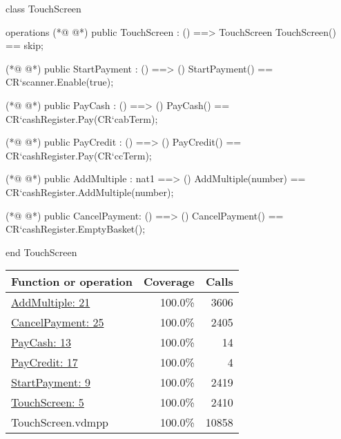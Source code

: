 \begin{vdmpp}
class TouchScreen


operations
(*@
\label{TouchScreen:5}
@*)
 public TouchScreen : () ==> TouchScreen
 TouchScreen() ==
  skip;

(*@
\label{StartPayment:9}
@*)
 public StartPayment : () ==> ()
 StartPayment() ==
  CR`scanner.Enable(true);

(*@
\label{PayCash:13}
@*)
 public PayCash : () ==> ()
 PayCash() ==
  CR`cashRegister.Pay(CR`cabTerm);

(*@
\label{PayCredit:17}
@*)
 public PayCredit : () ==> ()
 PayCredit() ==
  CR`cashRegister.Pay(CR`ccTerm);
  
(*@
\label{AddMultiple:21}
@*)
 public AddMultiple : nat1 ==> ()
 AddMultiple(number) == 
  CR`cashRegister.AddMultiple(number);
 
(*@
\label{CancelPayment:25}
@*)
 public CancelPayment: () ==> ()
 CancelPayment() == 
  CR`cashRegister.EmptyBasket();
  
end TouchScreen
\end{vdmpp}
\bigskip
\begin{longtable}{|l|r|r|}
\hline
Function or operation & Coverage & Calls \\
\hline
\hline
\hyperref[AddMultiple:21]{AddMultiple: 21} & 100.0\% & 3606 \\
\hline
\hyperref[CancelPayment:25]{CancelPayment: 25} & 100.0\% & 2405 \\
\hline
\hyperref[PayCash:13]{PayCash: 13} & 100.0\% & 14 \\
\hline
\hyperref[PayCredit:17]{PayCredit: 17} & 100.0\% & 4 \\
\hline
\hyperref[StartPayment:9]{StartPayment: 9} & 100.0\% & 2419 \\
\hline
\hyperref[TouchScreen:5]{TouchScreen: 5} & 100.0\% & 2410 \\
\hline
\hline
TouchScreen.vdmpp & 100.0\% & 10858 \\
\hline
\end{longtable}

